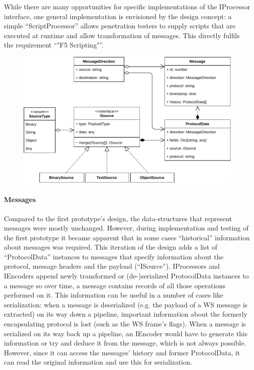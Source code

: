 While there are many opportunities for specific implementations of the IProcessor interface, one general implementation is envisioned by the design concept: a simple \enquote{ScriptProcessor} allows penetration testers to supply scripts that are executed at runtime and allow transformation of messages. This directly fulfils the requirement \enquote{"F5 Scripting"}.
\begin{figure}[h]
    \centering
    \includegraphics[width=14cm]{img/ch05/classes-4-messages.pdf}
    \label{fig:classes-4-messages}
\end{figure}
\paragraph{Messages}
Compared to the first prototype's design, the data-structures that represent messages were mostly unchanged. However, during implementation and testing of the first prototype it became apparent that in some cases \enquote{historical} information about messages was required. This iteration of the design adds a list of \enquote{ProtocolData} instances to messages that specify information about the protocol, message headers and the payload (\enquote{ISource}). IProcessors and IEncoders append newly transformed or (de-)serialized ProtocolData instances to a message so over time, a message contains records of all those operations performed on it. This information can be useful in a number of cases like serialization: when a message is deserialized (e.g. the payload of a \ac{WS} message is extracted) on its way down a pipeline, important information about the formerly encapsulating protocol is lost (such as the \ac{WS} frame's flags). When a message is serialized on its way back up a pipeline, an IEncoder would have to generate this information or try and deduce it from the message, which is not always possible. However, since it can access the messages' history and former ProtocolData, it can read the original information and use this for serialization.

